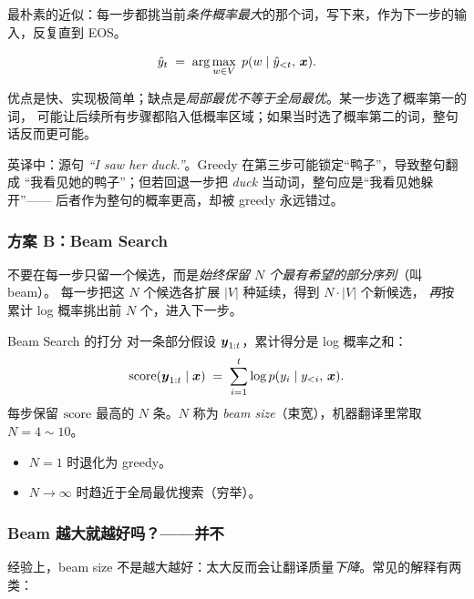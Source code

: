 \begin{intuitionblock}
最朴素的近似：每一步都挑当前\emph{条件概率最大}的那个词，写下来，作为下一步的输入，反复直到 EOS。
\end{intuitionblock}
\[
    \hat{y}_t \;=\; \arg\max_{w \in V} \; p(w \mid \hat{y}_{<t},\, \boldsymbol{x}).
\]

优点是快、实现极简单；缺点是\emph{局部最优不等于全局最优}。某一步选了概率第一的词，
可能让后续所有步骤都陷入低概率区域；如果当时选了概率第二的词，整句话反而更可能。

\begin{example}
英译中：源句 \emph{``I saw her duck.''}。Greedy 在第三步可能锁定“鸭子”，导致整句翻成
“我看见她的鸭子”；但若回退一步把 \emph{duck} 当动词，整句应是“我看见她躲开”——
后者作为整句的概率更高，却被 greedy 永远错过。
\end{example}

\subsubsection{方案 B：Beam Search}

\begin{intuitionblock}
不要在每一步只留一个候选，而是\emph{始终保留 $N$ 个最有希望的部分序列}（叫 beam）。
每一步把这 $N$ 个候选各扩展 $|V|$ 种延续，得到 $N\cdot|V|$ 个新候选，
\emph{再}按累计 log 概率挑出前 $N$ 个，进入下一步。
\end{intuitionblock}

\begin{mathbox}{Beam Search 的打分}
对一条部分假设 $\boldsymbol{y}_{1:t}$，累计得分是 log 概率之和：
\[
    \mathrm{score}(\boldsymbol{y}_{1:t} \mid \boldsymbol{x})
    \;=\; \sum_{i=1}^{t} \log p(y_i \mid y_{<i},\, \boldsymbol{x}).
\]
每步保留 $\mathrm{score}$ 最高的 $N$ 条。$N$ 称为 \emph{beam size}（束宽），机器翻译里常取
$N = 4 \sim 10$。
\end{mathbox}

\begin{itemize}
    \item $N = 1$ 时退化为 greedy。
    \item $N \to \infty$ 时趋近于全局最优搜索（穷举）。
\end{itemize}

\subsubsection{Beam 越大就越好吗？——并不}

经验上，beam size 不是越大越好：太大反而会让翻译质量\emph{下降}。常见的解释有两类：

